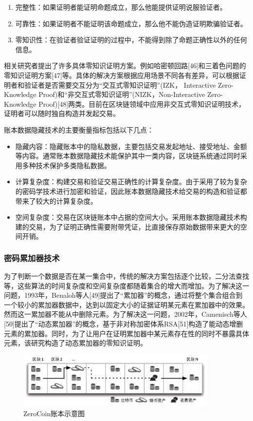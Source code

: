 \begin{enumerate}
	\item 完整性：如果证明者能证明命题成立，那么他能提供证明说服验证者。
	\item 可靠性：如果证明者不能证明该命题成立，那么他不能伪造证明欺骗验证者。
	\item 零知识性：在验证者验证证明的过程中，不能得到除了命题正确性以外的任何信息。
\end{enumerate}

相关研究者提出了许多具体零知识证明方案。例如哈密顿回路[46]和三着色问题的零知识证明方案[47]等。具体的解决方案根据应用场景不同各有差异，可以根据证明者和验证者是否需要交互分为“交互式零知识证明”(IZK， Interactive Zero-Knowledge Proof)和“非交互式零知识证明”(NIZK，Non-Interactive Zero-Knowledge Proof)[48]两类。目前在区块链领域中应用非交互式零知识证明技术，证明者可以随时独自构造并发起交易。

账本数据隐藏技术的主要衡量指标包括以下几点：

\begin{itemize}
	\item 隐藏内容：隐藏账本中的隐私数据，主要包括交易发起地址、接受地址、金额等内容。通常账本数据隐藏技术能保护其中一类内容，区块链系统通过同时采用多种技术保护多类隐私数据。
	\item 计算复杂度：构建交易和验证交易正确性的计算复杂度。由于采用了较为复杂的密码学技术进行加密和验证，因此账本数据隐藏技术给交易的构造和验证都带来了较大的计算复杂度。
	\item 空间复杂度：交易在区块链账本中占据的空间大小。采用账本数据隐藏技术构建的交易，为了证明正确性需要附带凭证，比直接保存原始数据带来更大的空间开销。
\end{itemize}

\subsubsection{密码累加器技术}

为了判断一个数据是否在某一集合中，传统的解决方案包括逐个比较，二分法查找等，这些算法的时间复杂度和空间复杂度都随着集合的增大而增加。为了解决这一问题，1993年，Benaloh等人[49]提出了“累加器”的概念，通过将整个集合组合到一个较小的累加器数据中，达到以固定大小的证据证明某元素在累加器中的效果。然而这一累加器不能从中删除元素。为了解决这一问题，2002年，Camenisch等人[50]提出了“动态累加器”的概念，基于非对称加密体系RSA[51]构造了能动态增删元素的累加器。同时，为了让用户在证明累加器中某元素存在性的同时不暴露具体元素，该研究构造了动态累加器的零知识证明。 
 
\begin{figure}
\centering
\includegraphics[width=10cm]{figures/zerocoin.png}
\caption{ZeroCoin账本示意图}
\label{fig:zerocoin}
\end{figure}

